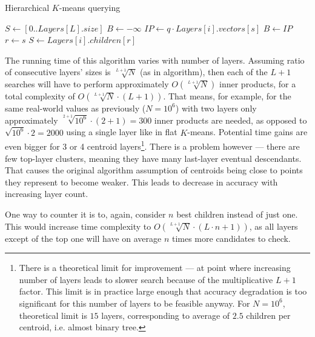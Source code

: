\begin{algorithm}[H]
	\caption{Hierarchical $K$-means querying}
	\begin{algorithmic}
		\State $ S \gets [0..Layers[L].size] $
			\State $ B \gets -\infty $
				\State $ IP \gets q \cdot Layers[i].vectors[s] $
					\State $ B \gets IP $
					\State $ r \gets s $
				\EndIf
			\EndFor
			\If{$ i = 0 $}
				\State \Return {$ r $}
			\EndIf
			\State $ S \gets Layers[i].children[r] $
		\EndFor
	\end{algorithmic}
\end{algorithm}

The running time of this algorithm varies with number of layers. Assuming 
ratio of consecutive layers' sizes is $ \sqrt[L+1]{N} $ (as in algorithm),
then each of the $ L + 1 $ searches will have to perform approximately
$ O(\sqrt[L+1]{N}) $ inner products, for a total complexity of
$ O(\sqrt[L+1]{N} \cdot (L + 1)) $. That means, for example, for the same real-world
values as previously ($ N=10^6 $) with two layers only approximately
$ \sqrt[2+1]{10^6} \cdot (2 + 1) = 300 $ inner products are needed, as opposed
to $ \sqrt{10^6} \cdot 2 = 2000 $ using a single layer like in flat $K$-means.
Potential time gains are even bigger for 3 or 4 centroid layers\footnote{
There is a theoretical limit for improvement --- at point where increasing
number of layers leads to slower search because of the multiplicative $L+1$ factor.
This limit is in practice large enough that accuracy degradation is too 
significant for this number of layers to be feasible anyway. 
For $N=10^6$, theoretical limit is $15$ layers, corresponding to average 
of $2.5$ children per centroid, i.e. almost binary tree.
}. There is a problem however --- there are few top-layer clusters,
meaning they have many last-layer eventual descendants. That causes the
original algorithm assumption of centroids being close to points they represent
to become weaker. This leads to decrease in accuracy with increasing layer
count.

One way to counter it is to, again, consider $n$ best children instead of
just one. This would increase time complexity to 
$ O(\sqrt[L+1]{N} \cdot (L \cdot n + 1)) $, as all layers except of the top one
will have on average $n$ times more candidates to check.

